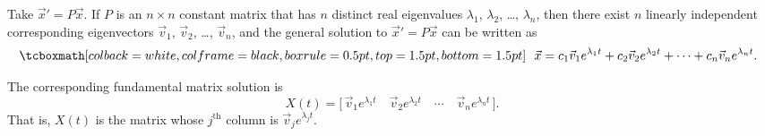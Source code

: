 \begin{theorem}
Take ${\vec{x}}' = P\vec{x}$.  If $P$ is an $n \times n$ constant matrix
that
has $n$ distinct real eigenvalues $\lambda_1$, $\lambda_2$, \ldots, $\lambda_n$,
then there exist $n$ linearly independent corresponding eigenvectors
$\vec{v}_1$, $\vec{v}_2$, \ldots, $\vec{v}_n$, and the general solution to
${\vec{x}}' = P\vec{x}$
can be written as
\begin{equation*}
\mybxbg{~~
\vec{x} = c_1 \vec{v}_1 e^{\lambda_1 t} +
c_2 \vec{v}_2 e^{\lambda_2 t} + \cdots +
c_n \vec{v}_n e^{\lambda_n t} .
~~}
\end{equation*}
\end{theorem}

The corresponding fundamental matrix solution is
\begin{equation*}
X(t) = \bigl[\, \vec{v}_1 e^{\lambda_1 t} \quad \vec{v}_2 e^{\lambda_2 t}
\quad \cdots \quad \vec{v}_n e^{\lambda_n t} \,\bigr].
\end{equation*}
That is, $X(t)$
is the matrix whose $j^{\text{th}}$ column is 
$\vec{v}_j e^{\lambda_j t}$.

